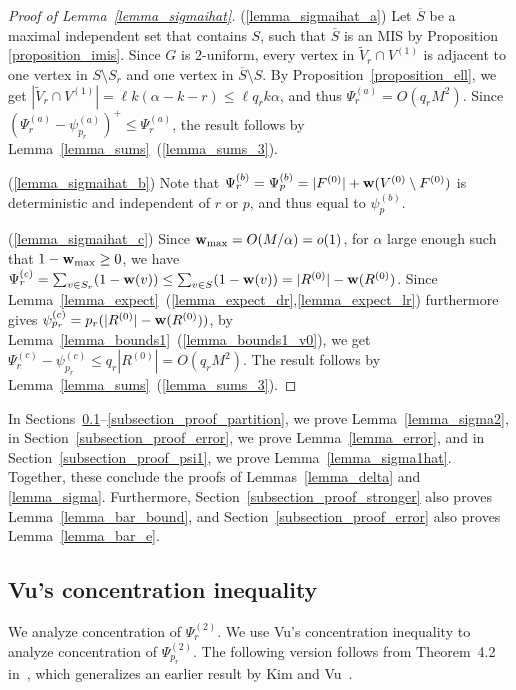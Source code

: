 \documentclass{article}
\theoremstyle{plain}
\theoremstyle{remark}
\theoremstyle{plain}
\numberwithin{equation}{section}
\renewcommand{\b}{{\bf{w}}}
\begin{document}
	\begin{proof}[Proof of Lemma~\ref{lemma_sigmaihat}]
		(\ref{lemma_sigmaihat_a}) Let $\overline{S}$ be a maximal independent set that contains $S$, such that $\overline{S}$ is an MIS by Proposition \ref{proposition_imis}. Since $G$ is $2$-uniform, every vertex in $\widetilde{V}_r\cap V^{(1)}$ is adjacent to one vertex in $S\setminus S_r$ and one vertex in $\overline{S}\setminus S$. By Proposition~\ref{proposition_ell}, we get $|\widetilde{V}_r\cap V^{(1)}|=\ell k(\alpha-k-r)\leq\ell q_rk\alpha$, and thus $\Psi_r^{(a)}=O(q_rM^2)$. Since $(\Psi_r^{(a)}-\psi_{p_r}^{(a)})^+\leq\Psi_r^{(a)}$, the result follows by Lemma~\ref{lemma_sums}~(\ref{lemma_sums_3}).
		
		(\ref{lemma_sigmaihat_b}) Note that $\Psi_r^{(b)}=\Psi_p^{(b)}=|F^{(0)}|+\b(V^{(0)}\setminus F^{(0)})$ is deterministic and independent of $r$ or $p$, and thus equal to $\psi_p^{(b)}$.
		
		(\ref{lemma_sigmaihat_c}) Since $\b_{\max}=O(M/\alpha)=o(1)$, for $\alpha$ large enough such that $1-\b_{\max}\geq0$, we have $\Psi_r^{(c)}=\sum_{v\in S_r}(1-\b(v))\leq\sum_{v\in S}(1-\b(v))=|R^{(0)}|-\b(R^{(0)})$. Since Lemma~\ref{lemma_expect}~(\ref{lemma_expect_dr},\ref{lemma_expect_lr}) furthermore gives $\psi_{p_r}^{(c)}=p_r(|R^{(0)}|-\b(R^{(0)}))$, by Lemma~\ref{lemma_bounds1}~(\ref{lemma_bounds1_v0}), we get $\Psi_r^{(c)}-\psi_{p_r}^{(c)}\leq q_r|R^{(0)}|=O(q_rM^2)$. The result follows by Lemma~\ref{lemma_sums}~(\ref{lemma_sums_3}).
	\end{proof}
	
	In Sections~\ref{subsection_proof_vu}--\ref{subsection_proof_partition}, we prove Lemma~\ref{lemma_sigma2}, in Section~\ref{subsection_proof_error}, we prove Lemma~\ref{lemma_error}, and in Section~\ref{subsection_proof_psi1}, we prove Lemma~\ref{lemma_sigma1hat}. Together, these conclude the proofs of Lemmas~\ref{lemma_delta} and \ref{lemma_sigma}. Furthermore, Section~\ref{subsection_proof_stronger} also proves Lemma~\ref{lemma_bar_bound}, and Section~\ref{subsection_proof_error} also proves Lemma~\ref{lemma_bar_e}.
	
	\subsection{Vu's concentration inequality}\label{subsection_proof_vu}
	
	We analyze concentration of $\Psi_r^{(2)}$. We use Vu's concentration inequality to analyze concentration of $\Psi_{p_r}^{(2)}$. The following version follows from Theorem~4.2 in~\cite{Vu}, which generalizes an earlier result by Kim and Vu~\cite{KimVu}.
	
\end{document}
